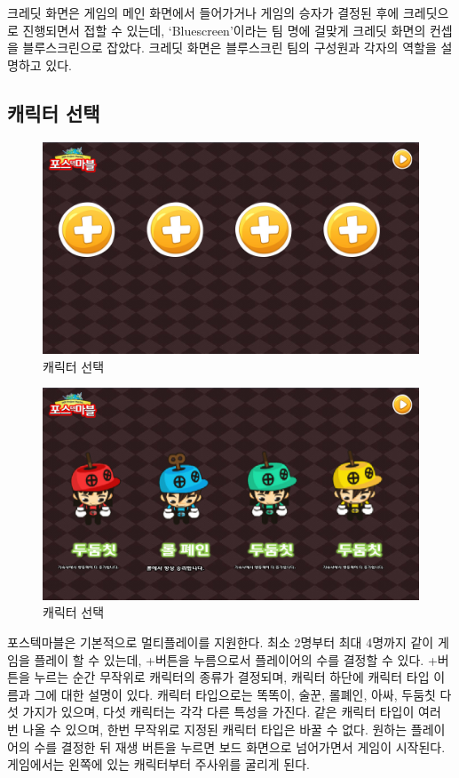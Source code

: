 \documentclass[10pt,oneside,a4paper,titlepage]{article}
\begin{document}
크레딧 화면은 게임의 메인 화면에서 들어가거나 게임의 승자가 결정된 후에 크레딧으로 진행되면서 접할 수 있는데, ‘Bluescreen’이라는 팀 명에 걸맞게 크레딧 화면의 컨셉을 블루스크린으로 잡았다. 크레딧 화면은 블루스크린 팀의 구성원과 각자의 역할을 설명하고 있다.

\subsection{캐릭터 선택}

\begin{figure}[H]
\centering
\centerline{\includegraphics[scale=0.65]{images/3SelectCharacter}}
\caption{캐릭터 선택}
\end{figure}

\begin{figure}[H]
\centering
\centerline{\includegraphics[scale=0.65]{images/3SelectCharacter2}}
\caption{캐릭터 선택}
\end{figure}
포스텍마블은 기본적으로 멀티플레이를 지원한다. 최소 2명부터 최대 4명까지 같이 게임을 플레이 할 수 있는데, +버튼을 누름으로서 플레이어의 수를 결정할 수 있다. +버튼을 누르는 순간 무작위로 캐릭터의 종류가 결정되며, 캐릭터 하단에 캐릭터 타입 이름과 그에 대한 설명이 있다. 캐릭터 타입으로는 똑똑이, 술꾼, 롤폐인, 아싸, 두둠칫 다섯 가지가 있으며, 다섯 캐릭터는 각각 다른 특성을 가진다. 같은 캐릭터 타입이 여러 번 나올 수 있으며, 한번 무작위로 지정된 캐릭터 타입은 바꿀 수 없다. 원하는 플레이어의 수를 결정한 뒤 재생 버튼을 누르면 보드 화면으로 넘어가면서 게임이 시작된다. 게임에서는 왼쪽에 있는 캐릭터부터 주사위를 굴리게 된다.
\end{document}
